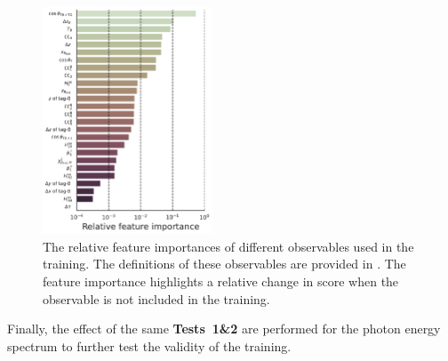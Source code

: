 
\begin{figure}[htbp!]
    \centering
    \includegraphics[width=0.45\textwidth]{figures/continuum_suppression/feature_importance.pdf}
    \caption{\label{fig:feature_importance} The relative feature importances of different observables used in the training.
    The definitions of these observables are provided in .
    The feature importance highlights a relative change in \AUC score when the observable is not included in the training.
    }
\end{figure}

Finally, the effect of the same \textbf{Tests~1\&2} are performed for the photon energy spectrum to further test the validity of the training.
